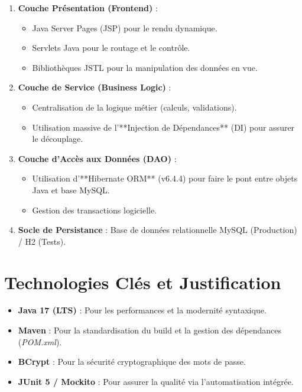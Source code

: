 \documentclass[12pt,a4paper]{report}
\begin{document}
\begin{enumerate}
    \item \textbf{Couche Présentation (Frontend)} :
        \begin{itemize}
            \item Java Server Pages (JSP) pour le rendu dynamique.
            \item Servlets Java pour le routage et le contrôle.
            \item Bibliothèques JSTL pour la manipulation des données en vue.
        \end{itemize}
    \item \textbf{Couche de Service (Business Logic)} :
        \begin{itemize}
            \item Centralisation de la logique métier (calculs, validations).
            \item Utilisation massive de l'**Injection de Dépendances** (DI) pour assurer le découplage.
        \end{itemize}
    \item \textbf{Couche d'Accès aux Données (DAO)} :
        \begin{itemize}
            \item Utilisation d'**Hibernate ORM** (v6.4.4) pour faire le pont entre objets Java et base MySQL.
            \item Gestion des transactions logicielle.
        \end{itemize}
    \item \textbf{Socle de Persistance} : Base de données relationnelle MySQL (Production) / H2 (Tests).
\end{enumerate}

\section{Technologies Clés et Justification}
\begin{itemize}
    \item \textbf{Java 17 (LTS)} : Pour les performances et la modernité syntaxique.
    \item \textbf{Maven} : Pour la standardisation du build et la gestion des dépendances (\textit{POM.xml}).
    \item \textbf{BCrypt} : Pour la sécurité cryptographique des mots de passe.
    \item \textbf{JUnit 5 / Mockito} : Pour assurer la qualité via l'automatisation intégrée.
\end{itemize}
\end{document}
